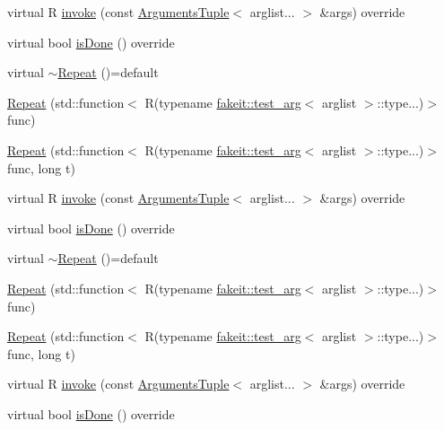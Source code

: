 \begin{DoxyCompactItemize}
\item 
virtual R \mbox{\hyperlink{structfakeit_1_1Repeat_a64e8c3a413edce162acaec724e832e19}{invoke}} (const \mbox{\hyperlink{namespacefakeit_a476a37a598825e1b5dd67b3a176491a1}{Arguments\+Tuple}}$<$ arglist... $>$ \&args) override
\item 
virtual bool \mbox{\hyperlink{structfakeit_1_1Repeat_a4822600fad5bce408fcd03d71ff333eb}{is\+Done}} () override
\item 
virtual \mbox{\hyperlink{structfakeit_1_1Repeat_a48edc25e2509018e7cc632fcf18eea42}{$\sim$\+Repeat}} ()=default
\item 
\mbox{\hyperlink{structfakeit_1_1Repeat_aee6893820759d2b0fa05975cdbac7e8c}{Repeat}} (std\+::function$<$ R(typename \mbox{\hyperlink{structfakeit_1_1test__arg}{fakeit\+::test\+\_\+arg}}$<$ arglist $>$\+::type...)$>$ func)
\item 
\mbox{\hyperlink{structfakeit_1_1Repeat_a3907a7a5430a75e296424f89c09b5eee}{Repeat}} (std\+::function$<$ R(typename \mbox{\hyperlink{structfakeit_1_1test__arg}{fakeit\+::test\+\_\+arg}}$<$ arglist $>$\+::type...)$>$ func, long t)
\item 
virtual R \mbox{\hyperlink{structfakeit_1_1Repeat_a64e8c3a413edce162acaec724e832e19}{invoke}} (const \mbox{\hyperlink{namespacefakeit_a476a37a598825e1b5dd67b3a176491a1}{Arguments\+Tuple}}$<$ arglist... $>$ \&args) override
\item 
virtual bool \mbox{\hyperlink{structfakeit_1_1Repeat_a4822600fad5bce408fcd03d71ff333eb}{is\+Done}} () override
\item 
virtual \mbox{\hyperlink{structfakeit_1_1Repeat_a48edc25e2509018e7cc632fcf18eea42}{$\sim$\+Repeat}} ()=default
\item 
\mbox{\hyperlink{structfakeit_1_1Repeat_aee6893820759d2b0fa05975cdbac7e8c}{Repeat}} (std\+::function$<$ R(typename \mbox{\hyperlink{structfakeit_1_1test__arg}{fakeit\+::test\+\_\+arg}}$<$ arglist $>$\+::type...)$>$ func)
\item 
\mbox{\hyperlink{structfakeit_1_1Repeat_a3907a7a5430a75e296424f89c09b5eee}{Repeat}} (std\+::function$<$ R(typename \mbox{\hyperlink{structfakeit_1_1test__arg}{fakeit\+::test\+\_\+arg}}$<$ arglist $>$\+::type...)$>$ func, long t)
\item 
virtual R \mbox{\hyperlink{structfakeit_1_1Repeat_a64e8c3a413edce162acaec724e832e19}{invoke}} (const \mbox{\hyperlink{namespacefakeit_a476a37a598825e1b5dd67b3a176491a1}{Arguments\+Tuple}}$<$ arglist... $>$ \&args) override
\item 
virtual bool \mbox{\hyperlink{structfakeit_1_1Repeat_a4822600fad5bce408fcd03d71ff333eb}{is\+Done}} () override

\end{DoxyCompactItemize}
